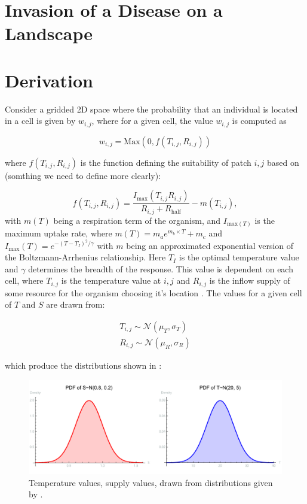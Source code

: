 \documentclass[11pt]{article}
\begin{document}
\section{Invasion of a Disease on a Landscape}

\section{Derivation}

Consider a gridded 2D space where the probability that an individual is located in a cell is given by $w_{i,j}$, where for a given cell, the value $w_{i,j}$ is computed as 

\begin{equation}
    w_{i,j} = \text{Max}(0, f(T_{i,j}, R_{i,j}))
\end{equation}

where $f(T_{i,j}, R_{i,j})$ is the function defining the suitability of patch $i,j$ based on (somthing we need to define more clearly):

\begin{equation}
    f(T_{i,j}, R_{i,j}) = \frac{I_{\text{max}}(T_{i,j} R_{i,j})}{R_{i,j} + R_{\text{half}}} - m(T_{i,j}),
\end{equation}
with $m(T)$ being a respiration term of the organism, and $I_{\text{max}(T)}$ is the maximum uptake rate, where $m(T) = m_a e^{m_b \times T} + m_c$ and $I_{\text{max}}(T) = e^{-(T - T_I)^2 / \gamma}$ with $m$ being an approximated exponential version of the Boltzmann-Arrhenius relationship. Here $T_I$ is the optimal temperature value and $\gamma$ determines the breadth of the response. This value is dependent on each cell, where $T_{i,j}$ is the temperature value at $i,j$ and $R_{i,j}$ is the inflow supply of some resource for the organism choosing it's location . The values for a given cell of $T$ and $S$ are drawn from: 

\begin{align} \label{eq:s-t}
    T_{i,j} \sim \mathcal{N}(\mu_T, \sigma_T) \\
    R_{i,j} \sim \mathcal{N}(\mu_R, \sigma_R)
\end{align}

which produce the distributions shown in :

\begin{figure}[!hpt]
    \centering
    \includegraphics[width=0.9\linewidth]{figs/temp-supply-wij-pdfs.pdf}
    \caption{Temperature values, supply values, drawn from distributions given by .}
    \label{fig:t-s-wij-pdfs}
\end{figure}
\end{document}
